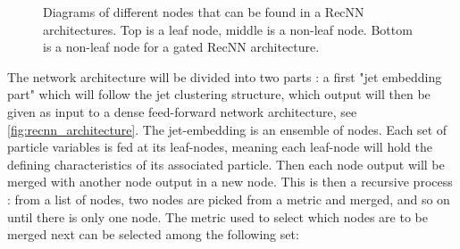 \begin{figure}
    \begin{center}
    
    
    
    \caption{Diagrams of different nodes that can be found in a RecNN architectures. Top is a leaf node, middle is a non-leaf node. Bottom is a non-leaf node for a gated RecNN architecture.}
    \label{fig:recnn_nodes}
    \end{center}
\end{figure}

The network architecture will be divided into two parts : a first "jet embedding part" which will follow the jet clustering structure, which output will then be given as input to a dense feed-forward network architecture, see \ref{fig:recnn_architecture}.
The jet-embedding is an ensemble of nodes. Each set of particle variables is fed at its leaf-nodes, meaning each leaf-node will hold the defining characteristics of its associated particle. Then each node output will be merged with another node output in a new node. 
This is then a recursive process : from a list of nodes, two nodes are picked from a metric and merged, and so on until there is only one node.
The metric used to select which nodes are to be merged next can be selected among the following set:
    
